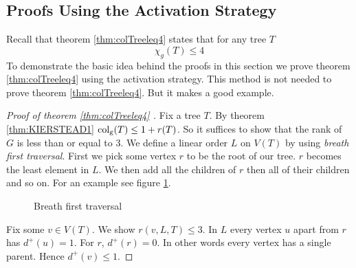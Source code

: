 \subsection{Proofs Using the Activation Strategy} \label{sec:actvStratProofs}
Recall that theorem \ref{thm:colTreeleq4} states that for any tree $T$ \[\chi_g(T)\leq 4\]
To demonstrate the basic idea behind the proofs in this section we prove theorem \ref{thm:colTreeleq4} using the activation strategy. This method is not needed to prove theorem \ref{thm:colTreeleq4}. But it makes a good example.

\begin{proof}[Proof of theorem \ref{thm:colTreeleq4} \cite{KIERSTEAD2000}]
    Fix a tree $T$. By theorem \ref{thm:KIERSTEAD1} $\operatorname{col_g}(T)\leq1 + r(T)$. So it suffices to show that the rank of $G$ is less than or equal to 3. We define a linear order $L$ on $V(T)$ by using \textit{breath first traversal}. First we pick some vertex $r$ to be the root of our tree. $r$ becomes the least element in $L$. We then add all the children of $r$ then all of their children and so on. For an example see figure \ref{fig:BFT}.  
    \begin{figure}[h]
        \centering
        \caption{Breath first traversal}
        \label{fig:BFT}
    \end{figure}
    Fix some $v\in V(T)$. We show $r(v,L,T)\leq 3$. In $L$ every vertex $u$ apart from $r$ has $d^+(u) = 1$. For $r$, $d^+(r) = 0$. In other words every vertex has a single parent. Hence $d^+(v)\leq 1$.
    

\end{proof}
